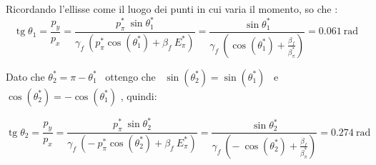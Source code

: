 \documentclass[12pt,twoside,a4]{article}
\DeclareMathOperator{\tg}{tg}
\begin{document}
\begin{solution}
\begin{enumerate}[label=(\textit{\roman*})]
 \bigskip
 Ricordando l'ellisse come il luogo dei punti in cui varia il momento, so che : 
 \begin{equation*}
     \tg{\theta_1} = \frac{p_y}{p_x} = \frac{p^\ast_\pi \ \sin{\theta^\ast_1}}{\gamma_f \ (p^\ast_\pi \cos{(\theta^\ast_1) + \beta_f \ E^\ast_\pi})} = \frac{\sin{\theta^\ast_1}}{\gamma_f \ \left(\cos{(\theta^\ast_1) + \frac{\beta_f}{\beta^\ast_\pi}}\right)} =  0.061 \ \mathrm{rad}     
 \end{equation*}
 
 \bigskip
 Dato che $\theta^\ast_2 = \pi - \theta^\ast_1 $ \ ottengo che \ $\sin{(\theta^\ast_2)} = \sin{(\theta^\ast_1)}$ \ e \  $\cos{(\theta^\ast_2)} = - \cos{(\theta^\ast_1)}$ , quindi: 
 
 \bigskip
 \begin{equation*}
     \tg{\theta_2} = \frac{p_y}{p_x} = \frac{p^\ast_\pi \ \sin{\theta^\ast_2}}{ \gamma_f \ (- \ p^\ast_\pi \cos{(\theta^\ast_2) + \beta_f \ E^\ast_\pi})} = \frac{\sin{\theta^\ast_2}}{\gamma_f \ \left(- \ \cos{(\theta^\ast_2) + \frac{\beta_f}{\beta^\ast_\pi}}\right)} =  0.274 \ \mathrm{rad}     
 \end{equation*}
 \end{enumerate}
 \end{solution}




\newpage
\end{document}
